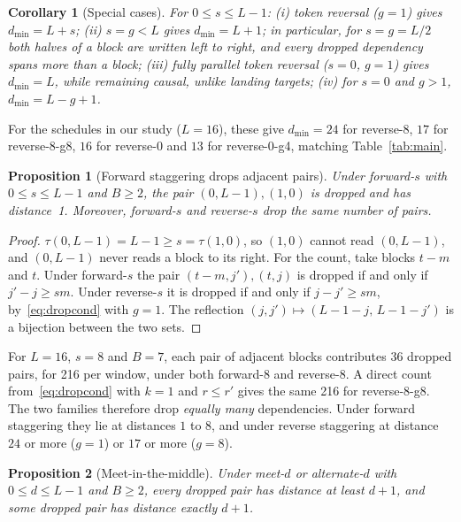 \documentclass[11pt]{article}
\newtheorem{proposition}{Proposition}
\newtheorem{corollary}{Corollary}
\theoremstyle{definition}
\theoremstyle{remark}
\newcommand{\sch}[1]{\textsf{#1}}
\newcommand{\dmin}{d_{\min}}
\begin{document}
\begin{corollary}[Special cases]
\label{cor:cases}
For $0\le s\le L-1$:
(i) token reversal ($g=1$) gives $\dmin=L+s$;
(ii) $s=g<L$ gives $\dmin=L+1$; in particular, for $s=g=L/2$ both halves of a block are written left to right, and every dropped dependency spans more than a block;
(iii) fully parallel token reversal ($s=0$, $g=1$) gives $\dmin=L$, while remaining causal, unlike landing targets;
(iv) for $s=0$ and $g>1$, $\dmin=L-g+1$.
\end{corollary}

For the schedules in our study ($L=16$), these give $\dmin=24$ for \sch{reverse-8}, $17$ for \sch{reverse-8-g8}, $16$ for \sch{reverse-0} and $13$ for \sch{reverse-0-g4}, matching Table~\ref{tab:main}.

\begin{proposition}[Forward staggering drops adjacent pairs]
\label{prop:forward}
Under \sch{forward-$s$} with $0\le s\le L-1$ and $B\ge2$, the pair $(0,L-1),(1,0)$ is dropped and has distance~1.
Moreover, \sch{forward-$s$} and \sch{reverse-$s$} drop the same number of pairs.
\end{proposition}

\begin{proof}
$\tau(0,L-1)=L-1\ge s=\tau(1,0)$, so $(1,0)$ cannot read $(0,L-1)$, and $(0,L-1)$ never reads a block to its right.
For the count, take blocks $t-m$ and $t$.
Under \sch{forward-$s$} the pair $(t-m,j'),(t,j)$ is dropped if and only if $j'-j\ge sm$.
Under \sch{reverse-$s$} it is dropped if and only if $j-j'\ge sm$, by~\eqref{eq:dropcond} with $g=1$.
The reflection $(j,j')\mapsto(L-1-j,\,L-1-j')$ is a bijection between the two sets.
\end{proof}

For $L=16$, $s=8$ and $B=7$, each pair of adjacent blocks contributes 36 dropped pairs, for 216 per window, under both \sch{forward-8} and \sch{reverse-8}.
A direct count from~\eqref{eq:dropcond} with $k=1$ and $r\le r'$ gives the same 216 for \sch{reverse-8-g8}.
The two families therefore drop \emph{equally many} dependencies.
Under forward staggering they lie at distances $1$ to $8$, and under reverse staggering at distance $24$ or more ($g=1$) or $17$ or more ($g=8$).
\begin{proposition}[Meet-in-the-middle]
\label{prop:meet}
Under \sch{meet-$d$} or \sch{alternate-$d$} with $0\le d\le L-1$ and $B\ge2$, every dropped pair has distance at least $d+1$, and some dropped pair has distance exactly $d+1$.
\end{proposition}
\end{document}
